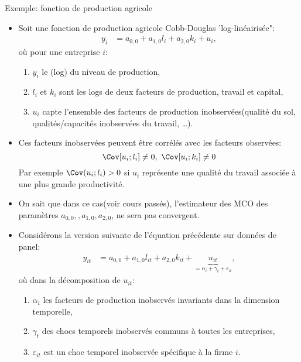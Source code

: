 \begin{frame}[allowframebreaks]{Exemple: fonction de production agricole}
    \begin{itemize}
        \item Soit une fonction de production agricole Cobb-Douglas 'log-linéairisée":
        \begin{align}
            y_i &= a_{0, 0} + a_{1, 0}l_i + a_{2, 0}k_i + u_i,
            \label{eq1}
        \end{align}
        où pour une entreprise $i$: 
        \begin{enumerate}[$\star$]
        \item $y_i$ le (log) du niveau de production, 
        \item $l_i$ et $k_i$ sont les logs de deux facteurs de production,
         travail et capital, 
         \item $u_i$ capte l'ensemble des facteurs de production inobservées(qualité du sol, qualités/capacités
         inobservées du travail, \ldots). 
        \end{enumerate}
         \item Ces facteurs inobservées peuvent être corrélés avec les facteurs observées:
         \[\Cov[u_i; l_i] \neq 0, \ \Cov[u_i; k_i] \neq 0\]
         Par exemple $\Cov(u_i; l_i)> 0$ si $u_i$ représente une qualité du travail associée 
         à une plus grande productivité.
         \item On sait que dans ce cas(voir cours passés), l'estimateur des MCO des paramètres $a_{0, 0},,a_{1, 0}, a_{2, 0}$, 
         ne sera pas convergent.
         \framebreak
         \item Considérons la version suivante de l'équation précédente sur données de panel:
         \begin{align}
            y_{it} &= a_{0, 0} + a_{1, 0}l_{it} + a_{2, 0}k_{it} + \underbrace{u_{it}}_{=\alpha_i + \gamma_t + \varepsilon_{it}},
            \label{eq2}
        \end{align}
        où dans la décomposition de $u_{it}$: 
        \begin{enumerate}[$\star$]
        \item $\alpha_i$ les facteurs de production inobservés invariants dans la dimension temporelle,
        \item $\gamma_t$ des chocs temporels inobservés communs à toutes les entreprises, 
        \item $\varepsilon_{it}$ 
        est un choc temporel inobservée spécifique à la firme $i$. 

\end{enumerate}
\end{itemize}
\end{frame}
